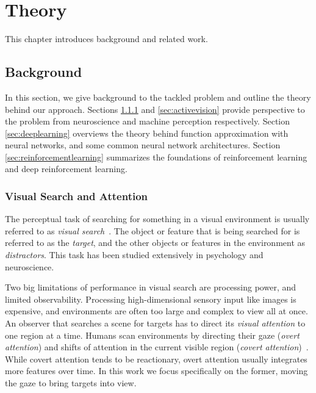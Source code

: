 \chapter{Theory}
\label{cha:theory}

This chapter introduces background and related work.

\section{Background}
\label{sec:background}

In this section, we give background to the tackled problem and outline the theory behind our approach.
Sections \ref{sec:visualsearch} and \ref{sec:activevision} provide perspective to the problem from neuroscience and machine perception respectively.
Section \ref{sec:deeplearning} overviews the theory behind function approximation with neural networks, and some common neural network architectures.
Section \ref{sec:reinforcementlearning} summarizes the foundations of reinforcement learning and deep reinforcement learning.

\subsection{Visual Search and Attention}
\label{sec:visualsearch}

The perceptual task of searching for something in a visual environment is usually referred to as \textit{visual search}~\cite{wolfe_visual_2010}.
The object or feature that is being searched for is referred to as the \textit{target}, and the other objects or features in the environment as \textit{distractors}.
This task has been studied extensively in psychology and neuroscience.

Two big limitations of performance in visual search are processing power, and limited observability.
Processing high-dimensional sensory input like images is expensive, and environments are often too large and complex to view all at once.
An observer that searches a scene for targets has to direct its \textit{visual attention} to one region at a time.
Humans scan environments by directing their gaze (\textit{overt attention}) and shifts of attention in the current visible region (\textit{covert attention})~\cite{itti_koch_2001}.
While covert attention tends to be reactionary, overt attention usually integrates more features over time.
In this work we focus specifically on the former, moving the gaze to bring targets into view.


